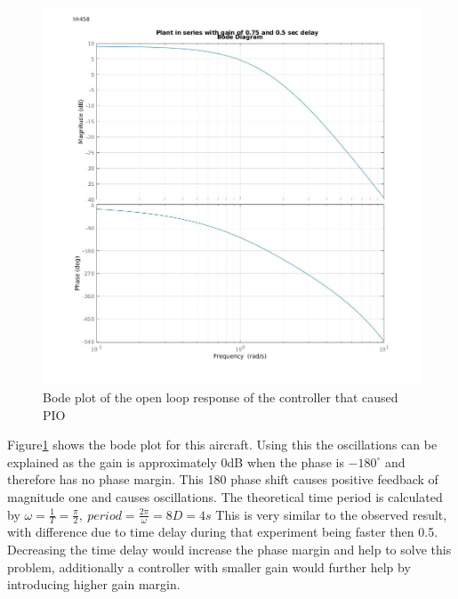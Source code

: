 \documentclass[twoside,twocolumn]{article}
\begin{document}
\begin{figure}[h]
  \centering
    \includegraphics[width=\linewidth]{2-1_bode}
  \caption{Bode plot of the open loop response of the controller that caused PIO}
  \label{fig:2-1bode}
\end{figure}
Figure\ref{fig:2-1bode} shows the bode plot for this aircraft. Using this the oscillations can be explained as the gain is approximately 0dB when the phase is $-180^{\circ}$ and therefore has no phase margin. This 180 phase shift causes positive feedback of magnitude one and causes oscillations. The theoretical time period is calculated by $\omega = \frac{1}{T} =\frac{\pi}{2}, \: period = \frac{2\pi}{\omega}= 8D = 4s$ This is very similar to the observed result, with difference due to time delay during that experiment being faster then 0.5. Decreasing the time delay would increase the phase margin and help to solve this problem, additionally a controller with smaller gain would further help by introducing higher gain margin.
\end{document}
